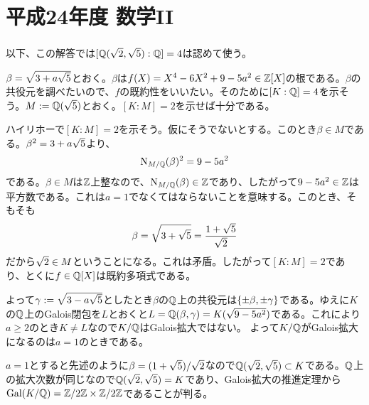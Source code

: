 \section{平成24年度 数学II}

\subsubsection{}%
\begin{sol}
  以下、この解答では$[{\mathbb Q}(\sqrt{2},\sqrt{5}): {\mathbb Q}] = 4$は認めて使う。

  $\beta = \sqrt{3 + a \sqrt{5}}$とおく。$\beta$は$f(X) = X^4 - 6X^2 + 9 -5a^2 \in {\mathbb Z}[X]$の根である。$\beta$の共役元を調べたいので、$f$の既約性をいいたい。そのために$[K:{\mathbb Q}]=4$を示そう。$M := {\mathbb Q}(\sqrt{5})$とおく。$[K:M]=2$を示せば十分である。

  ハイリホーで$[K:M]=2$を示そう。仮にそうでないとする。このとき$\beta \in M$である。$\beta^2 = 3 + a\sqrt{5}$より、
  \[
  \operatorname{N}_{M/{\mathbb Q}} (\beta)^2 = 9 - 5a^2
  \]
  である。$\beta \in M$は${\mathbb Z}$上整なので、$\operatorname{N}_{M/{\mathbb Q}} (\beta) \in {\mathbb Z}$であり、したがって$9 - 5a^2 \in {\mathbb Z}$は平方数である。これは$a=1$でなくてはならないことを意味する。このとき、そもそも
  \[
  \beta = \sqrt{3 + \sqrt{5}} = \frac{ 1 + \sqrt{5}}{ \sqrt{2}}
  \]
  だから$\sqrt{2} \in M$ということになる。これは矛盾。したがって$[K:M]=2$であり、とくに$f \in {\mathbb Q}[X]$は既約多項式である。

  よって${\gamma} := \sqrt{3 - a\sqrt{5}}$としたとき$\beta$の${\mathbb Q}$上の共役元は$\{ \pm \beta, \pm {\gamma} \}$である。ゆえに$K$の${\mathbb Q}$上のGalois閉包を$L$とおくと$L = {\mathbb Q}(\beta, {\gamma}) = K(\sqrt{9-5a^2})$である。これにより$a \geq 2$のとき$K \neq L$なので$K/{\mathbb Q}$はGalois拡大ではない。
  よって$K/{\mathbb Q}$がGalois拡大になるのは$a=1$のときである。

  $a=1$とすると先述のように$\beta = (1+\sqrt{5})/\sqrt{2}$なので${\mathbb Q}(\sqrt{2},\sqrt{5}) \subset K$である。${\mathbb Q}$上の拡大次数が同じなので${\mathbb Q}(\sqrt{2},\sqrt{5}) = K$であり、Galois拡大の推進定理から$\operatorname{Gal}(K/{\mathbb Q}) = \mathbb{Z} / 2 \mathbb{Z} \times \mathbb{Z} / 2 \mathbb{Z}$であることが判る。
\end{sol}
